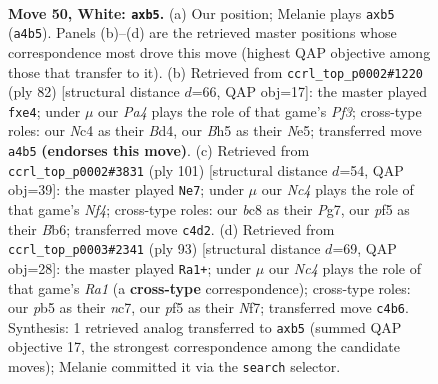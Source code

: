 \documentclass[11pt]{article}
\begin{document}
\clearpage

\begin{figure}[p]\centering
\begin{subfigure}{0.46\textwidth}\centering
\resizebox{\linewidth}{!}{%
\newchessgame
\chessboard[
  setfen={1nb2k2/r3n3/4p3/1p3p1B/PpN2P2/1P4PN/6KP/7R w - - 0 50},
  showmover=false,
  pgfstyle=straightmove, color=movearrow, markmove={a4-b5}
]}
\caption{}
\end{subfigure}\hfill
\begin{subfigure}{0.46\textwidth}\centering
\resizebox{\linewidth}{!}{%
\newchessgame
\chessboard[
  setfen={8/2n3pp/4kn2/pp2N3/3Bp3/1P3P1P/P5PK/8 w - - 0 42},
  showmover=false,
  pgfstyle=straightmove, color=movearrow, markmove={f3-e4}
]}
\caption{}
\end{subfigure}
\\[4pt]
\begin{subfigure}{0.46\textwidth}\centering
\resizebox{\linewidth}{!}{%
\newchessgame
\chessboard[
  setfen={8/p4kp1/1b3pp1/3r1n2/5RPP/2B2N2/1P2KP2/8 b - - 0 51},
  showmover=false,
  pgfstyle=straightmove, color=movearrow, markmove={f5-e7}
]}
\caption{}
\end{subfigure}\hfill
\begin{subfigure}{0.46\textwidth}\centering
\resizebox{\linewidth}{!}{%
\newchessgame
\chessboard[
  setfen={r5k1/2N2nbp/1p1p2p1/3Ppp2/4P2B/2R2P1P/6P1/7K b - - 5 47},
  showmover=false,
  pgfstyle=straightmove, color=movearrow, markmove={a8-a1}
]}
\caption{}
\end{subfigure}
\caption{\textbf{Move 50, White: \texttt{axb5}.} (a) Our position; Melanie plays \texttt{axb5} (\texttt{a4b5}). Panels (b)--(d) are the retrieved master positions whose correspondence most drove this move (highest QAP objective among those that transfer to it). (b) Retrieved from \texttt{ccrl\_top\_p0002\#1220} (ply 82) [structural distance $d$=66, QAP obj=17]: the master played \texttt{fxe4}; under $\mu$ our \emph{Pa4} plays the role of that game's \emph{Pf3}; cross-type roles: our \emph{N}c4 as their \emph{B}d4, our \emph{B}h5 as their \emph{N}e5; transferred move \texttt{a4b5} \textbf{(endorses this move)}. (c) Retrieved from \texttt{ccrl\_top\_p0002\#3831} (ply 101) [structural distance $d$=54, QAP obj=39]: the master played \texttt{Ne7}; under $\mu$ our \emph{Nc4} plays the role of that game's \emph{Nf4}; cross-type roles: our \emph{b}c8 as their \emph{P}g7, our \emph{p}f5 as their \emph{B}b6; transferred move \texttt{c4d2}. (d) Retrieved from \texttt{ccrl\_top\_p0003\#2341} (ply 93) [structural distance $d$=69, QAP obj=28]: the master played \texttt{Ra1+}; under $\mu$ our \emph{Nc4} plays the role of that game's \emph{Ra1} (a \textbf{cross-type} correspondence); cross-type roles: our \emph{p}b5 as their \emph{n}c7, our \emph{p}f5 as their \emph{N}f7; transferred move \texttt{c4b6}. Synthesis: 1 retrieved analog transferred to \texttt{axb5} (summed QAP objective 17, the strongest correspondence among the candidate moves); Melanie committed it via the \texttt{search} selector.}
\label{fig:thought-m98}
\end{figure}
\end{document}
